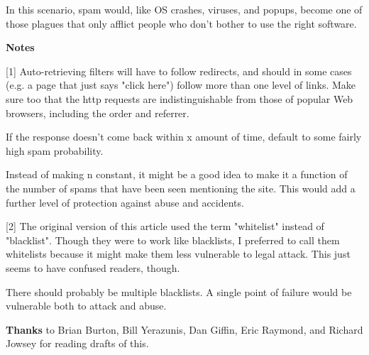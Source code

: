 In this scenario, spam would, like OS
                  crashes, viruses, and popups, become one of those plagues that
                  only afflict people who don't bother to use the right
                  software.




                  \textbf{Notes}

[1] Auto-retrieving filters will have
                  to follow redirects, and should in some cases (e.g. a page
                  that just says "click here") follow more than one level of
                  links. Make sure too that the http requests are
                  indistinguishable from those of popular Web browsers,
                  including the order and referrer.

If the response
                  doesn't come back within x amount of time, default to some
                  fairly high spam probability.

Instead of making n
                  constant, it might be a good idea to make it a function of the
                  number of spams that have been seen mentioning the site. This
                  would add a further level of protection against abuse and
                  accidents.

[2] The original version of this article
                  used the term "whitelist" instead of "blacklist". Though they
                  were to work like blacklists, I preferred to call them
                  whitelists because it might make them less vulnerable to legal
                  attack. This just seems to have confused readers, though.

There
                  should probably be multiple blacklists. A single point of
                  failure would be vulnerable both to attack and abuse.




                  \textbf{Thanks} to Brian Burton, Bill Yerazunis, Dan Giffin,
                  Eric Raymond, and Richard Jowsey for reading drafts of
                  this.


              
            
          
